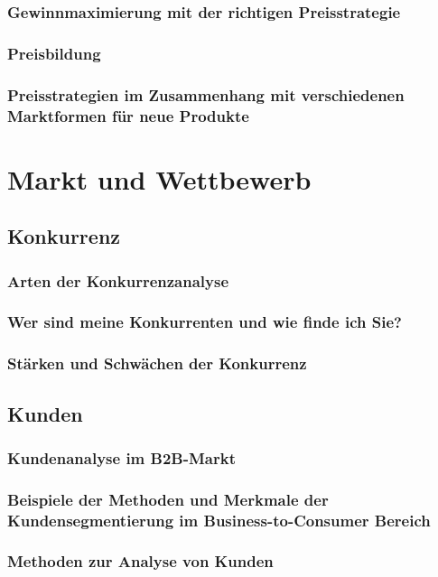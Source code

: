 \subsection{Gewinnmaximierung mit der richtigen Preisstrategie}

\subsection{Preisbildung}

\subsection{Preisstrategien im Zusammenhang mit verschiedenen Marktformen für neue Produkte}

\chapter{Markt und Wettbewerb}
\section{Konkurrenz}
\subsection{Arten der Konkurrenzanalyse}

\subsection{Wer sind meine Konkurrenten und wie finde ich Sie?}

\subsection{Stärken und Schwächen der Konkurrenz}

\section{Kunden}
\subsection{Kundenanalyse im B2B-Markt}

\subsection{Beispiele der Methoden und Merkmale der Kundensegmentierung im Business-to-Consumer Bereich}

\subsection{Methoden zur Analyse von Kunden}


